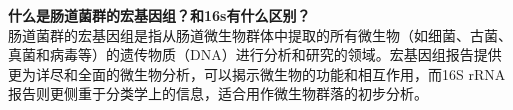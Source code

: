 \documentclass[UTF8]{ctexart}
\begin{document}
\begin{tcolorbox}[
    enhanced,
    colback=lightpurple!10, %
    colframe=white,  %
    arc=3mm,
    boxrule=0.5pt,
    width=\textwidth,
    top=8pt,
    bottom=8pt
]
{\small{\color{lightpurple}\faQuestionCircle}\quad \textbf{什么是肠道菌群的宏基因组？和16s有什么区别？}\\
{\color{orange!50}\faComments}\quad 肠道菌群的宏基因组是指从肠道微生物群体中提取的所有微生物（如细菌、古菌、真菌和病毒等）的遗传物质（DNA）进行分析和研究的领域。宏基因组报告提供更为详尽和全面的微生物分析，可以揭示微生物的功能和相互作用，而16S rRNA报告则更侧重于分类学上的信息，适合用作微生物群落的初步分析。
}
\end{tcolorbox}
%
\end{document}
